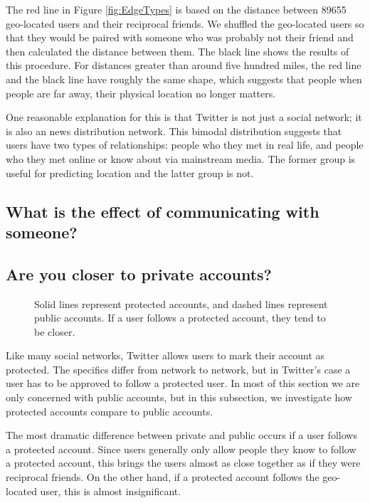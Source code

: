 \documentclass{sig-alternate}
\begin{document}
The red line in Figure \ref{fig:EdgeTypes} is based on the distance between
89655 geo-located users and their reciprocal friends. We shuffled the
geo-located users so that they would be paired with someone who was probably
not their friend and then calculated the distance between them. The black line
shows the results of this procedure. For distances greater than around five
hundred miles, the red line and the black line have roughly the same shape,
which suggests that people when people are far away, their physical location no longer matters.

One reasonable explanation for this is that Twitter is not just a social
network; it is also an news distribution network.  This bimodal distribution
suggests that users have two types of relationships: people who they met in
real life, and people who they met online or know about via mainstream media.
The former group is useful for predicting location and the latter group is not.

\subsection{What is the effect of communicating with someone?}

\subsection{Are you closer to private accounts?}
\begin{figure}
\centering
{}
\caption{ Solid lines represent protected accounts, and dashed lines represent
public accounts. If a user follows a protected account, they tend to be closer.}
\label{fig:EdgeTypesProt}
\end{figure}

Like many social networks, Twitter allows users to mark their account as protected. The specifics differ from network to network, but in Twitter's case a user has to be approved to follow a protected user.
In most of this section we are only concerned with public accounts, but in this subsection, we investigate how protected accounts compare to public accounts.

The most dramatic difference between private and public occurs if a user follows a protected account.
Since users generally only allow people they know to follow a protected account, this brings the users almost as close together as if they were reciprocal friends. On the other hand, if a protected account follows the geo-located user, this is almost insignificant.
\end{document}
